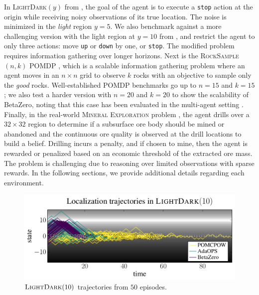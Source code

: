 In \textsc{LightDark$(y)$} from \textcite{platt2010belief}, the goal of the agent is to execute a \texttt{stop} action at the origin while receiving noisy observations of its true location.
The noise is minimized in the \textit{light} region ${y=5}$.
We also benchmark against a more challenging version with the light region at ${y=10}$ from \textcite{sunberg2018online}, and restrict the agent to only three actions: move \texttt{up} or \texttt{down} by one, or \texttt{stop}.
The modified problem requires information gathering over longer horizons.
Next is the \textsc{RockSample$(n,k)$} POMDP \cite{smith2004heuristic}, which is a scalable information gathering problem where an agent moves in an $n \times n$ grid to observe $k$ rocks with an objective to sample only the \textit{good} rocks.
Well-established POMDP benchmarks go up to $n=15$ and $k=15$; we also test a harder version with $n=20$ and $k=20$ to show the scalability of BetaZero, noting that this case has been evaluated in the multi-agent setting \cite{cai2021hyp}.
Finally, in the real-world \textsc{Mineral Exploration} problem \cite{mern2023intelligent}, the agent drills over a $32\times32$ region to determine if a subsurface ore body should be mined or abandoned and the continuous ore quality is observed at the drill locations to build a belief.
Drilling incurs a penalty, and if chosen to mine, then the agent is rewarded or penalized  based on an economic threshold of the extracted ore mass.
The problem is challenging due to reasoning over limited observations with sparse rewards.
In the following sections, we provide additional details regarding each environment.


\begin{figure}[b!]
    \centering
    \includegraphics[width=0.75\linewidth]{figures/betazero/results/lightdark_traj.pdf}
    \caption{$\textsc{LightDark}(10)$ trajectories from $50$ episodes.}
    \label{fig:lightdark_trajectories}
    \vspace*{-3mm}
\end{figure}


